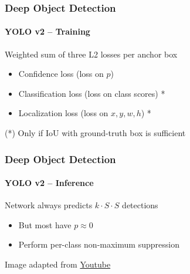 \documentclass[xetex,professionalfont]{beamer}
\begin{document}
\begin{frame}
	\frametitle{Deep Object Detection}
	\framesubtitle{YOLO v2 -- Training}

	Weighted sum of three L2 losses per anchor box
	\begin{itemize}
		\item Confidence loss (loss on $p$)
		\item Classification loss (loss on class scores) *
		\item Localization loss (loss on $x,y,w,h$) *
	\end{itemize}

	\bigskip

	(*) Only if IoU with ground-truth box is sufficient

\end{frame}


\begin{frame}
	\frametitle{Deep Object Detection}
	\framesubtitle{YOLO v2 -- Inference}

	Network always predicts $k\cdot S\cdot S$ detections %
	\begin{itemize}
		\item But most have $p\approx0$
		\item Perform per-class non-maximum suppression %
	\end{itemize}

	\medskip

	\begin{center}
		{\centering Image adapted from \href{https://www.youtube.com/watch?v=9s_FpMpdYW8}{Youtube}} %
	\end{center}

\end{frame}
\end{document}
